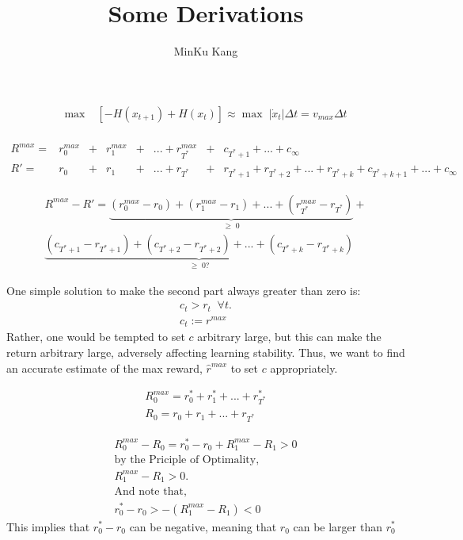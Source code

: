 \documentclass[12pt]{article}
\begin{document}
 
  
\title{Some Derivations}

\author{MinKu Kang}
 
\maketitle

\begin{align}
\max \; &\left[ - H(x_{t+1}) + H(x_{t}) \right] \approx 
\max \; | \dot{x}_t  | \Delta t = v_{max} \Delta t \\
\end{align}

\begin{align*}
R^{max} = &r_0^{max} &+ &r_1^{max} &+& ...  + r_{T^*}^{max} &+ &c_{T^{*}+1} + ... + c_{\infty} \\
R' = &r_0 &+ &r_1 &+& ... + r_{T^*} &+ &r_{T^{*}+1} + r_{T^{*}+2} + ... + r_{T^{*}+k} + c_{T^{*}+k+1} + ... + c_{\infty}  
\end{align*}

\begin{align*}
R^{max} - R' = \underbrace{(r_0^{max} - r_0) + (r_1^{max} - r_1) + ... + (r_{T^*}^{max} - r_{T^*})}_{\geq \; 0} + \\
\underbrace{(c_{T^{*}+1} - r_{T^{*}+1}) + (c_{T^{*}+2} - r_{T^{*}+2}) + ... + (c_{T^{*}+k} - r_{T^{*}+k})}_{\geq \; 0 ? }
\end{align*}

One simple solution to make the second part always greater than zero is:
\begin{align*}
c_t > r_t \;\; \forall t. \\
c_t := r^{max}
\end{align*}
Rather, one would be tempted to set $c$ arbitrary large, but this can make the return arbitrary large, adversely affecting learning stability. Thus, we want to find an accurate estimate of the max reward, $\hat{r}^{max}$ to set $c$ appropriately.

\begin{align*}
R_0^{max} = r_0^* + r_1^* + ... + r_{T^*}^* \\
R_0 = r_0 + r_1 + ... + r_{T^*}
\end{align*}

\begin{align*}
R_0^{max} - R_0 = r_0^* - r_0 + R_1^{max} - R_1 > 0 \\
\text{by the Priciple of Optimality,} \\
R_1^{max} - R_1 > 0. \\
\text{And note that,} \\
r_0^* - r_0 > - (R_1^{max} - R_1) < 0 
\end{align*}
This implies that $r_0^* - r_0$ can be negative, meaning that $r_0$ can be larger than $r_0^*$ 
\end{document}
